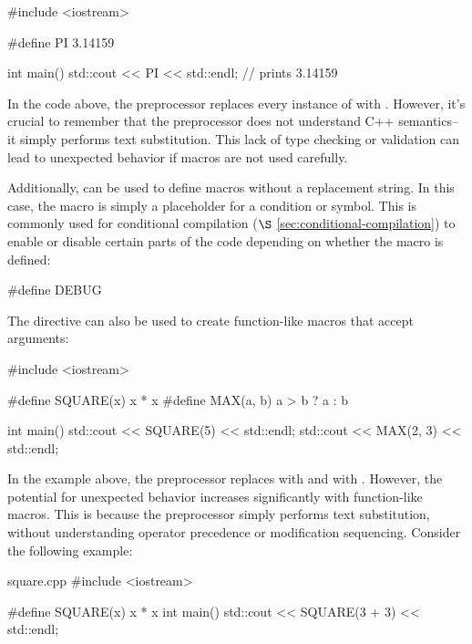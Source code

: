 \documentclass[12pt]{article}
\begin{document}
\begin{cxx}{}
#include <iostream>

#define PI 3.14159

int main()
{
	std::cout << PI << std::endl; // prints 3.14159
}
\end{cxx}

\noindent
In the code above, the preprocessor replaces every instance of  with .
However, it's crucial to remember that the preprocessor does not understand C++ semantics--it simply performs text substitution.
This lack of type checking or validation can lead to unexpected behavior if macros are not used carefully.

\vspace{1em}
\noindent
Additionally,  can be used to define macros without a replacement string.
In this case, the macro is simply a placeholder for a condition or symbol.
This is commonly used for conditional compilation ($\S$ \ref{sec:conditional-compilation}) to enable or disable certain parts of the code depending on whether the macro is defined:

\begin{cxx}{}
#define DEBUG
\end{cxx}

\noindent
The  directive can also be used to create function-like macros that accept arguments:

\begin{cxx}{}
#include <iostream>

#define SQUARE(x) x * x
#define MAX(a, b) a > b ? a : b

int main()
{
    std::cout << SQUARE(5) << std::endl;
    std::cout << MAX(2, 3) << std::endl;
}
\end{cxx}

\noindent
\noindent In the example above, the preprocessor replaces  with  and  with .
However, the potential for unexpected behavior increases significantly with function-like macros.
This is because the preprocessor simply performs text substitution, without understanding operator precedence or modification sequencing.
Consider the following example:

\begin{cxx}{square.cpp}
#include <iostream>

#define SQUARE(x) x * x
int main()
{
	std::cout << SQUARE(3 + 3) << std::endl;
}
\end{cxx}
\end{document}
